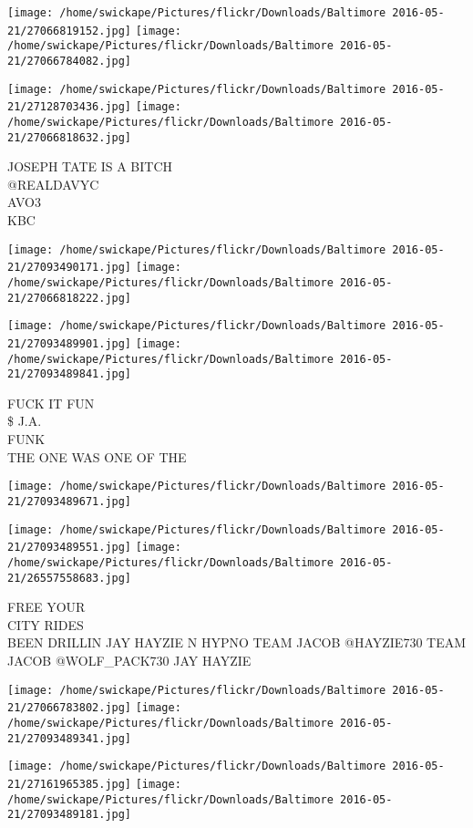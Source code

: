 \documentclass[10pt,letterpaper]{article}
\begin{document}
\texttt{[image: /home/swickape/Pictures/flickr/Downloads/Baltimore 2016-05-21/27066819152.jpg]}
\texttt{[image: /home/swickape/Pictures/flickr/Downloads/Baltimore 2016-05-21/27066784082.jpg]}

\texttt{[image: /home/swickape/Pictures/flickr/Downloads/Baltimore 2016-05-21/27128703436.jpg]}
\texttt{[image: /home/swickape/Pictures/flickr/Downloads/Baltimore 2016-05-21/27066818632.jpg]}

JOSEPH TATE IS A BITCH\\
@REALDAVYC\\
AVO3\\
KBC
\pagebreak

\texttt{[image: /home/swickape/Pictures/flickr/Downloads/Baltimore 2016-05-21/27093490171.jpg]}
\texttt{[image: /home/swickape/Pictures/flickr/Downloads/Baltimore 2016-05-21/27066818222.jpg]}

\texttt{[image: /home/swickape/Pictures/flickr/Downloads/Baltimore 2016-05-21/27093489901.jpg]}
\texttt{[image: /home/swickape/Pictures/flickr/Downloads/Baltimore 2016-05-21/27093489841.jpg]}

FUCK IT FUN\\
\$ J.A.\\
FUNK\\
THE ONE WAS ONE OF THE
\pagebreak

\texttt{[image: /home/swickape/Pictures/flickr/Downloads/Baltimore 2016-05-21/27093489671.jpg]}

\vspace{0.25in}
\texttt{[image: /home/swickape/Pictures/flickr/Downloads/Baltimore 2016-05-21/27093489551.jpg]}
\texttt{[image: /home/swickape/Pictures/flickr/Downloads/Baltimore 2016-05-21/26557558683.jpg]}

FREE YOUR\\
CITY RIDES\\
BEEN DRILLIN JAY HAYZIE N HYPNO TEAM JACOB @HAYZIE730 TEAM JACOB @WOLF\_PACK730 JAY HAYZIE
\pagebreak

\texttt{[image: /home/swickape/Pictures/flickr/Downloads/Baltimore 2016-05-21/27066783802.jpg]}
\texttt{[image: /home/swickape/Pictures/flickr/Downloads/Baltimore 2016-05-21/27093489341.jpg]}

\texttt{[image: /home/swickape/Pictures/flickr/Downloads/Baltimore 2016-05-21/27161965385.jpg]}
\texttt{[image: /home/swickape/Pictures/flickr/Downloads/Baltimore 2016-05-21/27093489181.jpg]}
\end{document}
